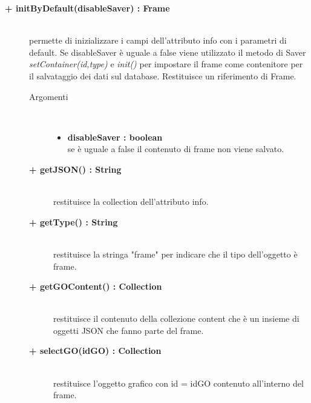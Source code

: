 \begin{description}
\begin{description}
\end{description}

\begin{description}
		\item[\textbf{\color{blue}+ initByDefault(disableSaver) : Frame			}] \hfill \\
			permette di inizializzare i campi dell'attributo info con i parametri di default. Se disableSaver è uguale a false viene utilizzato il metodo di Saver \textit{setContainer(id,type)} e \textit{init()} per impostare il frame come contenitore per il salvataggio dei dati sul database. Restituisce un riferimento di Frame.

\begin{description}
			\item[Argomenti] \hfill \\
				\begin{itemize}
						\item \textbf{disableSaver : boolean			} \hfill \\
					se è uguale a false il contenuto di frame non viene salvato. %
				\end{itemize}

\end{description}

\begin{description}
		\item[\textbf{\color{blue}+ getJSON() : String			}] \hfill \\
			restituisce la collection dell'attributo info.

\end{description}

\begin{description}
		\item[\textbf{\color{blue}+ getType() : String			}] \hfill \\
			restituisce la stringa "frame" per indicare che il tipo dell'oggetto è frame.
\end{description}

\begin{description}
		\item[\textbf{\color{blue}+ getGOContent() : Collection			}] \hfill \\
			restituisce il contenuto della collezione content che è un insieme di oggetti JSON che fanno parte del frame.
\end{description}

\begin{description}
		\item[\textbf{\color{blue}+ selectGO(idGO) : Collection			}] \hfill \\
			restituisce l'oggetto grafico con id = idGO contenuto all'interno del frame. 


\end{description}
\end{description}
\end{description}
